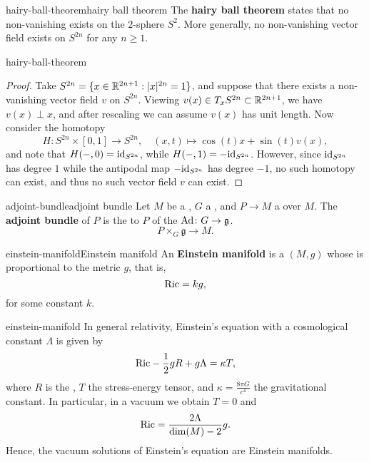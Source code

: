 \begin{topic}{hairy-ball-theorem}{hairy ball theorem}
    The \textbf{hairy ball theorem} states that no non-vanishing  exists on the $2$-sphere $S^2$. More generally, no non-vanishing vector field exists on $S^{2n}$ for any $n \ge 1$.
\end{topic}

\begin{example}{hairy-ball-theorem}
    \begin{proof}
        Take $S^{2n} = \{ x \in \mathbb{R}^{2n + 1} : |x|^{2n} = 1 \}$, and suppose that there exists a non-vanishing vector field $v$ on $S^{2n}$. Viewing $v(x) \in T_x S^{2n} \subset \mathbb{R}^{2n + 1}$, we have $v(x) \perp x$, and after rescaling we can assume $v(x)$ has unit length. Now consider the homotopy
        \[ H \colon S^{2n} \times [0, 1] \to S^{2n}, \quad (x, t) \mapsto \cos(t) x + \sin(t) v(x) , \]
        and note that $H(-, 0) = \textup{id}_{S^{2n}}$, while $H(-, 1) = -\textup{id}_{S^{2n}}$. However, since $\textup{id}_{S^{2n}}$ has degree $1$ while the antipodal map $-\textup{id}_{S^{2n}}$ has degree $-1$, no such homotopy can exist, and thus no such vector field $v$ can exist.
    \end{proof}
\end{example}

\begin{topic}{adjoint-bundle}{adjoint bundle}
    Let $M$ be a , $G$ a , and $P \to M$ a  over $M$. The \textbf{adjoint bundle} of $P$ is the  to $P$ of the  $\textup{Ad} \colon G \to \mathfrak{g}$.
    \[ P \times_G \mathfrak{g} \to M . \]
\end{topic}

\begin{topic}{einstein-manifold}{Einstein manifold}
    An \textbf{Einstein manifold} is a  $(M, g)$ whose  is proportional to the metric $g$, that is,
    \[ \textup{Ric} = kg , \]
    for some constant $k$.
\end{topic}

\begin{example}{einstein-manifold}
    In general relativity, Einstein's equation with a cosmological constant $\Lambda$ is given by
    \[ \textup{Ric} - \frac{1}{2} g R + g \Lambda = \kappa T ,
    \]
    where $R$ is the , $T$ the stress-energy tensor, and $\kappa = \frac{8 \pi G}{c^4}$ the gravitational constant. In particular, in a vacuum we obtain $T = 0$ and
    \[ \textup{Ric} = \frac{2 \Lambda}{\dim(M) - 2} g . \]
    Hence, the vacuum solutions of Einstein's equation are Einstein manifolds.
\end{example}

